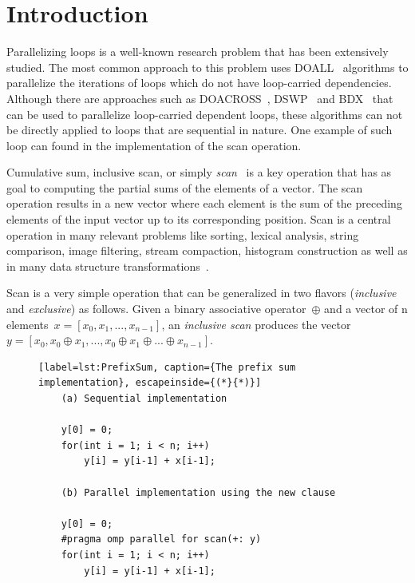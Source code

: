 \documentclass[Ingles]{ic-tese-v1}
\begin{document}
\fimdaspaginasiniciais


\chapter{Introduction}
\label{cap:Introduction}

Parallelizing loops  is a  well-known research  problem that  has been
extensively  studied. The  most common  approach to  this problem  uses
DOALL~\cite{Lamport:1974} algorithms  to parallelize
the iterations of  loops which do not  have loop-carried dependencies.
Although  there  are   approaches  such  as  DOACROSS~\cite{doacross},
DSWP~\cite{Rangan:2004} and  BDX~\cite{Cesar:2015} that
can be  used to parallelize loop-carried dependent  loops, these algorithms
can  not  be  directly  applied   to  loops  that  are  sequential  in
nature. One  example of such loop  can found in the  implementation of
the scan operation.

Cumulative     sum,     inclusive     scan,     or     simply     {\it
scan}~\cite{ScanAsPrimitive} is  a key operation that  has as goal
to computing  the partial  sums of  the elements of  a vector.  The scan
operation results in a new vector where each element is the sum of the
preceding  elements  of  the  input vector  up  to  its  corresponding
position. Scan is a central operation in many  relevant  problems  like  sorting,
lexical  analysis,  string comparison,  image  filtering, stream compaction,
histogram construction as well as  in many data
structure transformations~\cite{BlellochTR90}.

Scan  is a very simple  operation  that can  be generalized
in two flavors (\textit{inclusive} and \textit{exclusive}) as follows.
Given  a binary  associative  operator\  $\oplus$ and  a
vector of  n elements\ $x = [x_{0},  x_{1}, ...  ,x_{n-1}]$,
an   {\em    inclusive   scan}    produces   the    vector
$y =  [ x_{0}, x_{0}  \oplus x_{1},  ... ,x_{0} \oplus  x_{1} \oplus
... \oplus x_{n-1}]$.

\begin{figure}[t]
	\lstset{basicstyle=\scriptsize}
	\begin{lstlisting}[label=lst:PrefixSum, caption={The prefix sum implementation}, escapeinside={(*}{*)}]
	(a) Sequential implementation

	y[0] = 0;
	for(int i = 1; i < n; i++)
		y[i] = y[i-1] + x[i-1];

	(b) Parallel implementation using the new clause

	y[0] = 0;
	#pragma omp parallel for scan(+: y)
	for(int i = 1; i < n; i++)
		y[i] = y[i-1] + x[i-1];
	\end{lstlisting}
	\vspace{-0.7cm}
\end{figure}
\end{document}
